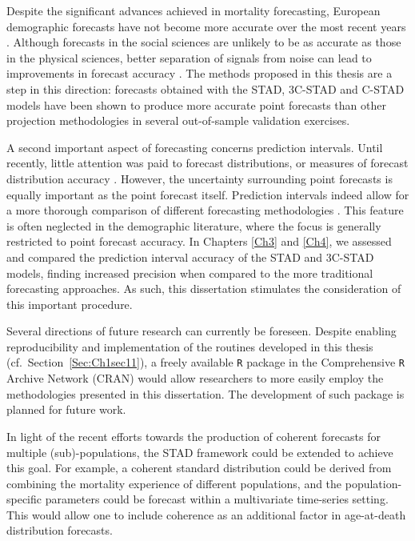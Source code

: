 \documentclass[Thesis]{subfiles}
\begin{document}
Despite the significant advances achieved in mortality forecasting, European demographic forecasts have not become more accurate over the most recent years \citep{keilman2008european}. Although forecasts in the social sciences are unlikely to be as accurate as those in the physical sciences, better separation of signals from noise can lead to improvements in forecast accuracy \citep{makridakis2019forecasting}. The methods proposed in this thesis are a step in this direction: forecasts obtained with the STAD, 3C-STAD and C-STAD models have been shown to produce more accurate point forecasts than other projection methodologies in several out-of-sample validation exercises.

A second important aspect of forecasting concerns prediction intervals. Until recently, little attention was paid to forecast distributions, or measures of forecast distribution accuracy  \citep{makridakis2019forecasting}. However, the uncertainty surrounding point forecasts is equally important as the point forecast itself.  Prediction intervals indeed allow for a more thorough comparison of different forecasting methodologies \citep{chatfield2000time}. This feature is often neglected in the demographic literature, where the focus is generally restricted to point forecast accuracy. In Chapters \ref{Ch3} and \ref{Ch4}, we assessed and compared the prediction interval accuracy of the STAD and 3C-STAD models, finding increased precision when compared to the more traditional forecasting approaches. As such, this dissertation stimulates the consideration of this important procedure. 

Several directions of future research can currently be foreseen. Despite enabling reproducibility and implementation of the routines developed in this thesis (cf.~Section~\ref{Sec:Ch1sec11}), a freely available \texttt{R} package \citep{Rcite} in the Comprehensive \texttt{R} Archive Network (CRAN) would allow researchers to more easily employ the methodologies presented in this dissertation. The development of such package is planned for future work.

In light of the recent efforts towards the production of coherent forecasts for multiple (sub)-populations, the STAD framework could be extended to achieve this goal. For example, a coherent standard distribution could be derived from combining the mortality experience of different populations, and the population-specific parameters could be forecast within a multivariate time-series setting. This would allow one to include coherence as an additional factor in age-at-death distribution forecasts.
\end{document}
